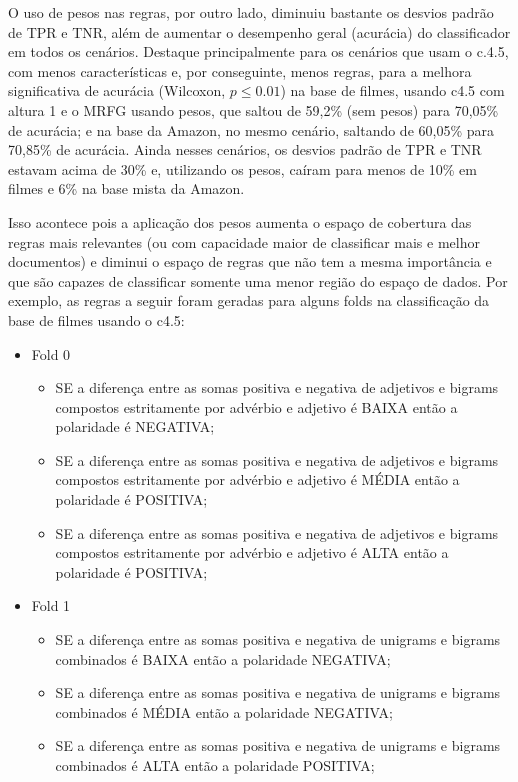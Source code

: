 \documentclass[template.tex]{subfiles}
\begin{document}
O uso de pesos nas regras, por outro lado, diminuiu bastante os desvios padrão de TPR e TNR, além de aumentar o desempenho geral (acurácia) do classificador em todos os cenários. Destaque principalmente para os cenários que usam o c.4.5, com menos características e, por conseguinte, menos regras, para a melhora significativa de acurácia (Wilcoxon, $p\leq0.01$) na base de filmes, usando c4.5 com altura 1 e o MRFG usando pesos, que saltou de 59,2\% (sem pesos) para 70,05\% de acurácia; e na base da Amazon, no mesmo cenário, saltando de 60,05\% para 70,85\% de acurácia. Ainda nesses cenários, os desvios padrão de TPR e TNR estavam acima de 30\% e, utilizando os pesos, caíram para menos de 10\% em filmes e 6\% na base mista da Amazon.

Isso acontece pois a aplicação dos pesos aumenta o espaço de cobertura das regras mais relevantes (ou com capacidade maior de classificar mais e melhor documentos) e diminui o espaço de regras que não tem a mesma importância e que são capazes de classificar somente uma menor região do espaço de dados. Por exemplo, as regras a seguir foram geradas para alguns folds na classificação da base de filmes usando o c4.5:

\begin{itemize}
\item Fold 0
\begin{itemize}
\item SE a diferença entre as somas positiva e negativa de adjetivos e bigrams compostos estritamente por advérbio e adjetivo é BAIXA então a polaridade é NEGATIVA;
\item SE a diferença entre as somas positiva e negativa de adjetivos e bigrams compostos estritamente por advérbio e adjetivo é MÉDIA então a polaridade é POSITIVA;
\item SE a diferença entre as somas positiva e negativa de adjetivos e bigrams compostos estritamente por advérbio e adjetivo é ALTA então a polaridade é POSITIVA;
\end{itemize}
\item Fold 1
\begin{itemize}
\item SE a diferença entre as somas positiva e negativa de unigrams e bigrams combinados é BAIXA então a polaridade NEGATIVA;
\item SE a diferença entre as somas positiva e negativa de unigrams e bigrams combinados é MÉDIA então a polaridade NEGATIVA;
\item SE a diferença entre as somas positiva e negativa de unigrams e bigrams combinados é ALTA então a polaridade POSITIVA;
\end{itemize}
\end{itemize}
\end{document}
